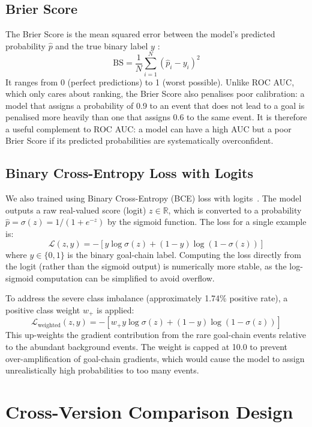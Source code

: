 \subsection{Brier Score}

The Brier Score is the mean squared error between the model's predicted probability $\hat{p}$ and the true binary label $y$ \cite{brier1950}:
\[
    \text{BS} = \frac{1}{N} \sum_{i=1}^{N} (\hat{p}_i - y_i)^2
\]
It ranges from 0 (perfect predictions) to 1 (worst possible). Unlike ROC AUC, which only cares about ranking, the Brier Score also penalises poor calibration: a model that assigns a probability of 0.9 to an event that does not lead to a goal is penalised more heavily than one that assigns 0.6 to the same event. It is therefore a useful complement to ROC AUC: a model can have a high AUC but a poor Brier Score if its predicted probabilities are systematically overconfident.

\subsection{Binary Cross-Entropy Loss with Logits}\label{sec:meth_bce}

We also trained using Binary Cross-Entropy (BCE) loss with logits~\cite{bishop2006}. The model outputs a raw real-valued score (logit) $z \in \mathbb{R}$, which is converted to a probability $\hat{p} = \sigma(z) = 1 / (1 + e^{-z})$ by the sigmoid function. The loss for a single example is:
\[
    \mathcal{L}(z, y) = -\left[y \log \sigma(z) + (1 - y) \log(1 - \sigma(z))\right]
\]
where $y \in \{0, 1\}$ is the binary goal-chain label. Computing the loss directly from the logit (rather than the sigmoid output) is numerically more stable, as the log-sigmoid computation can be simplified to avoid overflow.

To address the severe class imbalance (approximately 1.74\% positive rate), a positive class weight $w_+$ is applied:
\[
    \mathcal{L}_\text{weighted}(z, y) = -\left[w_+ y \log \sigma(z) + (1 - y) \log(1 - \sigma(z))\right]
\]
This up-weights the gradient contribution from the rare goal-chain events relative to the abundant background events. The weight is capped at 10.0 to prevent over-amplification of goal-chain gradients, which would cause the model to assign unrealistically high probabilities to too many events.

\section{Cross-Version Comparison Design}

